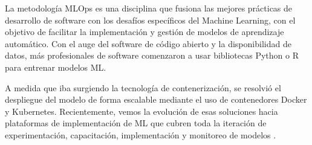 \newpage
La metodología MLOps es una disciplina que fusiona las mejores prácticas de desarrollo de software con los desafíos específicos del Machine Learning, con el objetivo de facilitar la implementación y gestión de modelos de aprendizaje automático. Con el auge del software de código abierto y la disponibilidad de datos, más profesionales de software comenzaron a usar bibliotecas Python o R para entrenar modelos ML. 

A medida que iba surgiendo la tecnología de contenerización, se resolvió el despliegue del modelo de forma escalable mediante el uso de contenedores Docker y Kubernetes. Recientemente, vemos la evolución de esas soluciones hacia plataformas de implementación de ML que cubren toda la iteración de experimentación, capacitación, implementación y monitoreo de modelos \citep{visengeriyeva2020}.
\newpage

